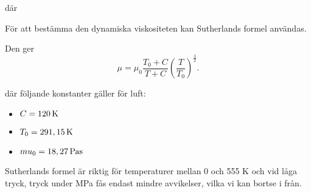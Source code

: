 där 

För att bestämma den dynamiska viskositeten kan Sutherlands formel användas. %

Den ger  
\begin{equation}
{\mu} = {\mu}_0 \frac {T_0+C} {T + C} \left (\frac {T} {T_0} \right )^{\frac{3}{2}}.
\end{equation}

där följande konstanter gäller för luft:
\begin{itemize}
\item[] $C=\unit[120]{K}$
\item[] $T_0=\unit[291,15]{K}$
\item[] $mu_0=\unit[18,27]{Pa s}$
\end{itemize}

Sutherlands formel är riktig för temperaturer mellan 0 och 555 K och vid låga tryck, tryck under \unit[3,45]{MPa} fås endast mindre avvikelser, vilka vi kan bortse i från.






